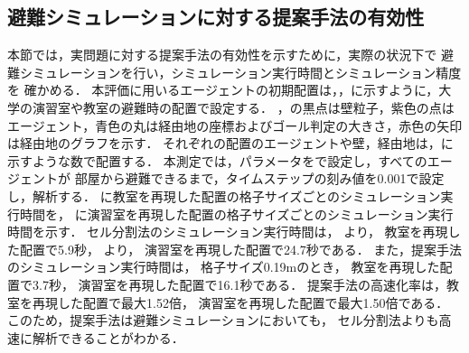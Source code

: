 \subsection{避難シミュレーションに対する提案手法の有効性}
\label{sec:5_real}
本節では，実問題に対する提案手法の有効性を示すために，実際の状況下で
避難シミュレーションを行い，シミュレーション実行時間とシミュレーション精度を
確かめる．
本評価に用いるエージェントの初期配置は，，に示すように，大学の演習室や教室の避難時の配置で設定する．
，の黒点は壁粒子，紫色の点はエージェント，青色の丸は経由地の座標およびゴール判定の大きさ，赤色の矢印は経由地のグラフを示す．
それぞれの配置のエージェントや壁，経由地は，に示すような数で配置する．
本測定では，パラメータをで設定し，すべてのエージェントが
部屋から避難できるまで，タイムステップの刻み値を0.001で設定し，解析する．
に教室を再現した配置の格子サイズごとのシミュレーション実行時間を，
に演習室を再現した配置の格子サイズごとのシミュレーション実行時間を示す．
セル分割法のシミュレーション実行時間は，
より，
教室を再現した配置で5.9秒，
より，
演習室を再現した配置で24.7秒である．
また，提案手法のシミュレーション実行時間は，
格子サイズ0.19mのとき，
教室を再現した配置で3.7秒，
演習室を再現した配置で16.1秒である．
提案手法の高速化率は，教室を再現した配置で最大1.52倍，
演習室を再現した配置で最大1.50倍である．
このため，提案手法は避難シミュレーションにおいても，
セル分割法よりも高速に解析できることがわかる．

